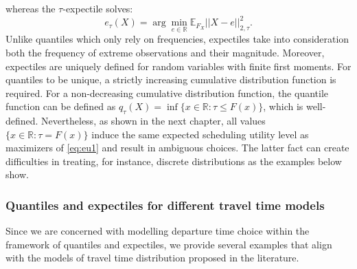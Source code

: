 \documentclass[preprint, 3p, authoryear]{elsarticle} %
\theoremstyle{definition}
\theoremstyle{definition}
\theoremstyle{definition}
\theoremstyle{definition}
\theoremstyle{remark}
\begin{document}
whereas the \(\tau\)-expectile solves:
\begin{equation}
e_\tau(X) = \arg\min_{e\in\mathbb R}\mathbb E_{F_X}||X-e||^2_{2,\tau}.\label{eq:expectile}
\end{equation}
Unlike quantiles which only rely on frequencies, expectiles take into consideration both the frequency of extreme observations and their magnitude.
Moreover, expectiles are uniquely defined for random variables with finite first moments. For quantiles to be unique, a strictly increasing cumulative distribution function is required. For a non-decreasing cumulative distribution function, the quantile function can be defined as \(q_\tau(X) = \inf\{x\in \mathbb R: \tau\leq F(x)\}\), which is well-defined. Nevertheless, as shown in the next chapter, all values \(\{x\in\mathbb R: \tau= F(x)\}\) induce the same expected scheduling utility level as maximizers of \eqref{eq:eu1} and result in ambiguous choices. The latter fact can create difficulties in treating, for instance, discrete distributions as the examples below show.

\hypertarget{quantiles-and-expectiles-for-different-travel-time-models}{%
\subsubsection{Quantiles and expectiles for different travel time models}\label{quantiles-and-expectiles-for-different-travel-time-models}}

Since we are concerned with modelling departure time choice within the framework of quantiles and expectiles, we provide several examples that align with the models of travel time distribution proposed in the literature.
\end{document}
